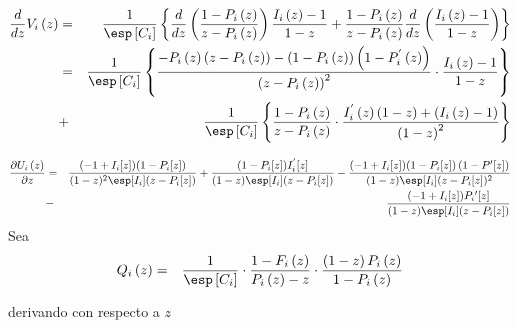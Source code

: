 \begin{eqnarray*}
\frac{d}{dz}V_{i}\left(z\right)&=&\frac{1}{\esp\left[C_{i}\right]}\left\{\frac{d}{dz}\left(\frac{1-P_{i}\left(z\right)}{z-P_{i}\left(z\right)}\right)\frac{I_{i}\left(z\right)-1}{1-z}+\frac{1-P_{i}\left(z\right)}{z-P_{i}\left(z\right)}\frac{d}{dz}\left(\frac{I_{i}\left(z\right)-1}{1-z}\right)\right\}\\
&=&\frac{1}{\esp\left[C_{i}\right]}\left\{\frac{-P_{i}\left(z\right)\left(z-P_{i}\left(z\right)\right)-\left(1-P_{i}\left(z\right)\right)\left(1-P_{i}^{'}\left(z\right)\right)}{\left(z-P_{i}\left(z\right)\right)^{2}}\cdot\frac{I_{i}\left(z\right)-1}{1-z}\right\}\\
&+&\frac{1}{\esp\left[C_{i}\right]}\left\{\frac{1-P_{i}\left(z\right)}{z-P_{i}\left(z\right)}\cdot\frac{I_{i}^{'}\left(z\right)\left(1-z\right)+\left(I_{i}\left(z\right)-1\right)}{\left(1-z\right)^{2}}\right\}
\end{eqnarray*}


\begin{eqnarray*}
\frac{\partial U_{i}\left(z\right)}{\partial z}&=&\frac{(-1+I_{i}[z]) (1-P_{i}[z])}{(1-z)^2 \esp[I_{i}] (z-P_{i}[z])}+\frac{(1-P_{i}[z]) I_{i}^{'}[z]}{(1-z) \esp[I_{i}] (z-P_{i}[z])}-\frac{(-1+I_{i}[z]) (1-P_{i}[z])\left(1-P{'}[z]\right)}{(1-z) \esp[I_{i}] (z-P_{i}[z])^2}\\
&-&\frac{(-1+I_{i}[z]) P_{i}{'}[z]}{(1-z) \esp[I_{i}](z-P_{i}[z])}
\end{eqnarray*}
Sea 
\begin{eqnarray*}
Q_{i}\left(z\right)&=&\frac{1}{\esp\left[C_{i}\right]}\cdot\frac{1-F_{i}\left(z\right)}{P_{i}\left(z\right)-z}\cdot\frac{\left(1-z\right)P_{i}\left(z\right)}{1-P_{i}\left(z\right)}
\end{eqnarray*}

derivando con respecto a $z$



